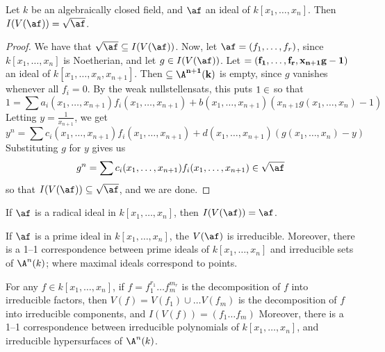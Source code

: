 \begin{theorem}\label{theorem_1.7.3}
    Let $k$ be an algebraically closed field, and  $\af$ an ideal of  $k[x_1,
    \dots, x_n]$. Then $I(V(\af))=\sqrt{\af}$.
\end{theorem}
\begin{proof}
    We have that $\sqrt{\af} \subseteq I(V(\af))$. Now, let $\af=(f_1, \dots,
    f_r)$, since $k[x_1, \dots, x_n]$ is Noetherian, and let $g \in I(V(\af))$.
    Let $\bf=(f_1, \dots, f_r,x_{n+1}g-1)$ an ideal of $k[x_1, \dots,
    x_n,x_{n+1}]$. Then $\bf \subseteq \A^{n+1}(k)$ is empty, since $g$ vanishes
    whenever all $f_i=0$. By the weak nullstellensats, this puts  $1 \in \bf$ so
    that
    \begin{equation*}
        1=\sum{a_i(x_1, \dots, x_{n+1})f_i(x_1, \dots, x_{n+1})}+b(x_1, \dots,
        x_{n+1})(x_{n+1}g(x_1, \dots, x_n)-1)
    \end{equation*}
    Letting $y=\frac{1}{x_{n+1}}$, we get
    \begin{equation*}
        y^n=\sum{c_i(x_1, \dots, x_{n+1})f_i(x_1, \dots, x_{n+1})}+d(x_1, \dots,
        x_{n+1})(g(x_1, \dots, x_n)-y)
    \end{equation*}
    Substituting $g$ for $y$ gives us
    \begin{equation*}
        g^n=\sum{c_i(x_1, \dots, x_{n+1})f_i(x_1, \dots, x_{n+1})} \in \sqrt{\af}
    \end{equation*}
    so that $I(V(\af)) \subseteq \sqrt{\af}$, and we are done.
\end{proof}
\begin{corollary}
    If $\af$ is a radical ideal in  $k[x_1, \dots, x_n]$, then $I(V(\af))=\af$.
\end{corollary}
\begin{corollary}
    If $\af$ is a prime ideal in $k[x_1, \dots, x_n]$, the $V(\af)$ is
    irreducible. Moreover, there is a 1--1 correspondence between prime ideals
    of $k[x_1, \dots, x_n]$ and irreducible sets of $\A^n(k)$; where maximal
    ideals correspond to points.
\end{corollary}
\begin{corollary}
    For any $f \in k[x_1, \dots, x_n]$, if $f=f_1^{r_1} \dots f_m^{m_r}$ is the
    decomposition of $f$ into irreducible factors, then  $V(f)=V(f_1) \cup \dots
    V(f_m)$ is the decomposition of $f$ into irreducible components, and
    $I(V(f))=(f_1 \dots f_m)$ Moreover, there is a 1--1 correspondence between irreducible
    polynomials of  $k[x_1, \dots, x_n]$, and irreducible hypersurfaces of
    $\A^n(k)$.
\end{corollary}
